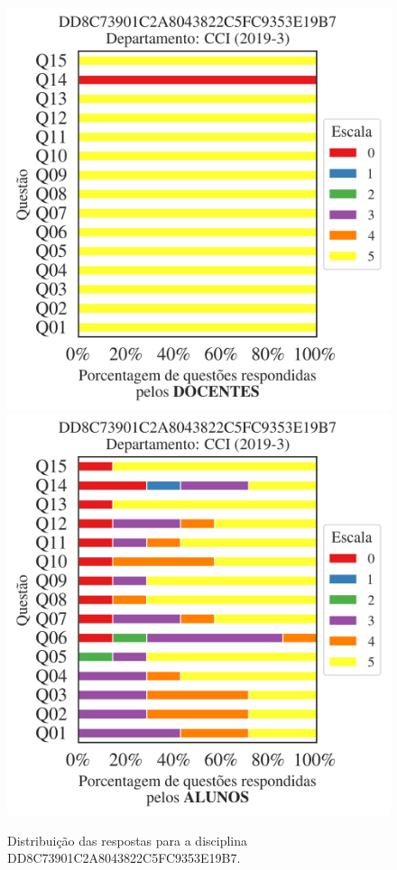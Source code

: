 \documentclass[a4paper,10pt]{article}
\begin{document}
\begin{figure}[h]
\centering
\includegraphics[width=0.485\linewidth]{analise_disciplina_departamento_CCI_DD8C73901C2A8043822C5FC9353E19B7_docentes.png}
\includegraphics[width=0.485\linewidth]{analise_disciplina_departamento_CCI_DD8C73901C2A8043822C5FC9353E19B7_alunos.png}
\caption{\label{fig:analise_geral_departamento}                Distribuição das respostas para a disciplina DD8C73901C2A8043822C5FC9353E19B7. }
\end{figure}
\end{document}
